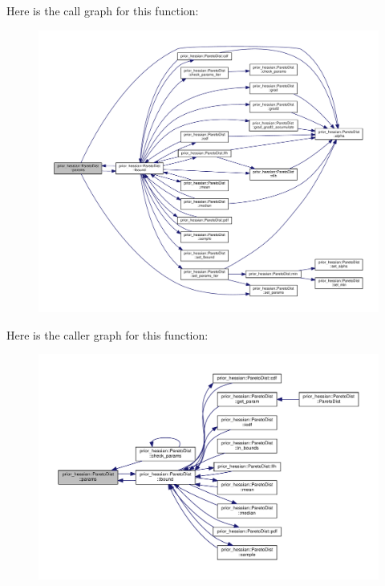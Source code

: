 Here is the call graph for this function\+:\nopagebreak
\begin{figure}[H]
\begin{center}
\leavevmode
\includegraphics[width=350pt]{classprior__hessian_1_1ParetoDist_af5791e2cef16b34e1bbdeec24b13d22e_cgraph}
\end{center}
\end{figure}




Here is the caller graph for this function\+:\nopagebreak
\begin{figure}[H]
\begin{center}
\leavevmode
\includegraphics[width=350pt]{classprior__hessian_1_1ParetoDist_af5791e2cef16b34e1bbdeec24b13d22e_icgraph}
\end{center}
\end{figure}


